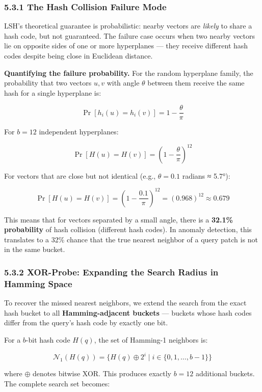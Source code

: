 \subsubsection{5.3.1 The Hash Collision Failure Mode}\label{the-hash-collision-failure-mode}

LSH's theoretical guarantee is probabilistic: nearby vectors are \emph{likely} to share a hash code, but not guaranteed. The failure case occurs when two nearby vectors lie on opposite sides of one or more hyperplanes --- they receive different hash codes despite being close in Euclidean distance.

\textbf{Quantifying the failure probability.} For the random hyperplane family, the probability that two vectors \(u, v\) with angle \(\theta\) between them receive the same hash for a single hyperplane is:

\[\Pr[h_i(u) = h_i(v)] = 1 - \frac{\theta}{\pi}\]

For \(b = 12\) independent hyperplanes:

\[\Pr[H(u) = H(v)] = \left(1 - \frac{\theta}{\pi}\right)^{12}\]

For vectors that are close but not identical (e.g., \(\theta = 0.1\) radians ≈ 5.7°):

\[\Pr[H(u) = H(v)] = \left(1 - \frac{0.1}{\pi}\right)^{12} = (0.968)^{12} \approx 0.679\]

This means that for vectors separated by a small angle, there is a \textbf{32.1\% probability} of hash collision (different hash codes). In anomaly detection, this translates to a 32\% chance that the true nearest neighbor of a query patch is not in the same bucket.

\subsubsection{5.3.2 XOR-Probe: Expanding the Search Radius in Hamming Space}\label{xor-probe-expanding-the-search-radius-in-hamming-space}

To recover the missed nearest neighbors, we extend the search from the exact hash bucket to all \textbf{Hamming-adjacent buckets} --- buckets whose hash codes differ from the query's hash code by exactly one bit.

For a \(b\)-bit hash code \(H(q)\), the set of Hamming-1 neighbors is:

\[\mathcal{N}_1(H(q)) = \{H(q) \oplus 2^i \mid i \in \{0, 1, \ldots, b-1\}\}\]

where \(\oplus\) denotes bitwise XOR. This produces exactly \(b = 12\) additional buckets. The complete search set becomes:

